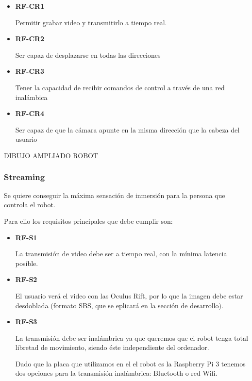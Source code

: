 \documentclass[twoside, 12pt]{epstfg}
\begin{document}
\begin{itemize}
	\item \textbf{RF-CR1}
	
	Permitir grabar video y transmitirlo a tiempo real.
	
	
	\item\textbf{RF-CR2} 
	
	Ser capaz de desplazarse en todas las direcciones
	
	
	\item\textbf{RF-CR3}
	
	Tener la capacidad de recibir comandos de control a través de una red inalámbica
	
	
	\item\textbf{RF-CR4} 
	
	Ser capaz de que la cámara apunte en la misma dirección que la cabeza del usuario
\end{itemize}

DIBUJO AMPLIADO ROBOT

\subsubsection{Streaming}

Se quiere conseguir la máxima sensación de inmersión para la persona que controla el robot.

Para ello los requisitos principales que debe cumplir son:

\begin{itemize}
	\item\textbf{RF-S1}
	
	La transmisión de video debe ser  a tiempo real, con la mínima latencia posible.
	
	\item\textbf{RF-S2}
	
	El usuario verá el video con  las Oculus Rift, por lo que la imagen debe estar desdoblada (formato SBS, que se eplicará en la sección de desarrollo).
	
	\item\textbf{RF-S3}
	
	La transmisión debe ser inalámbrica ya que queremos que el robot tenga total libretad de movimiento, siendo éste independiente del ordenador.
	
	
	Dado que la placa que utilizamos en el el robot es la Raspberry Pi 3 tenemos dos opciones para la transmisión inalámbrica: Bluetooth o red Wifi.
	
\end{itemize}
\end{document}
